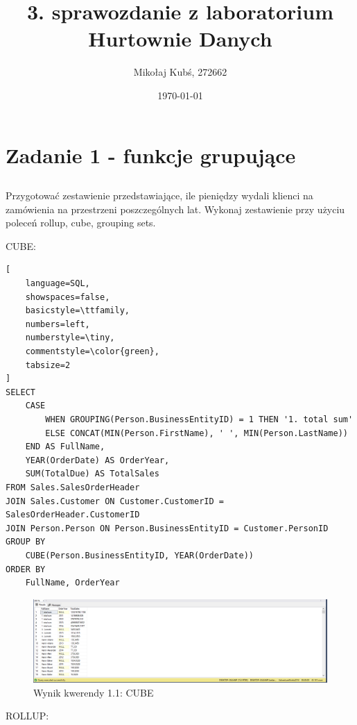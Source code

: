 \documentclass[a4paper,12pt]{article}
\title{3. sprawozdanie z laboratorium Hurtownie Danych}
\author{Mikołaj Kubś, 272662}
\date{\today}
\begin{document}
\maketitle

\section{Zadanie 1 - funkcje grupujące}

\subsection{}

Przygotować zestawienie przedstawiające, ile pieniędzy wydali klienci na zamówienia
na przestrzeni poszczególnych lat.
Wykonaj zestawienie przy użyciu poleceń rollup, cube, grouping sets.

CUBE:

{\small
\begin{lstlisting}[
	language=SQL,
	showspaces=false,
	basicstyle=\ttfamily,
	numbers=left,
	numberstyle=\tiny,
	commentstyle=\color{green},
	tabsize=2
]
SELECT
    CASE 
        WHEN GROUPING(Person.BusinessEntityID) = 1 THEN '1. total sum'
        ELSE CONCAT(MIN(Person.FirstName), ' ', MIN(Person.LastName))
    END AS FullName,
    YEAR(OrderDate) AS OrderYear,
    SUM(TotalDue) AS TotalSales
FROM Sales.SalesOrderHeader
JOIN Sales.Customer ON Customer.CustomerID = SalesOrderHeader.CustomerID
JOIN Person.Person ON Person.BusinessEntityID = Customer.PersonID
GROUP BY 
    CUBE(Person.BusinessEntityID, YEAR(OrderDate))
ORDER BY 
    FullName, OrderYear
\end{lstlisting}}

\begin{figure}[H]
  \centering
  \includegraphics[width=1.0\textwidth]{images/1.1_cube.png}
  \caption{Wynik kwerendy 1.1: CUBE}
\end{figure}

ROLLUP:
\end{document}
